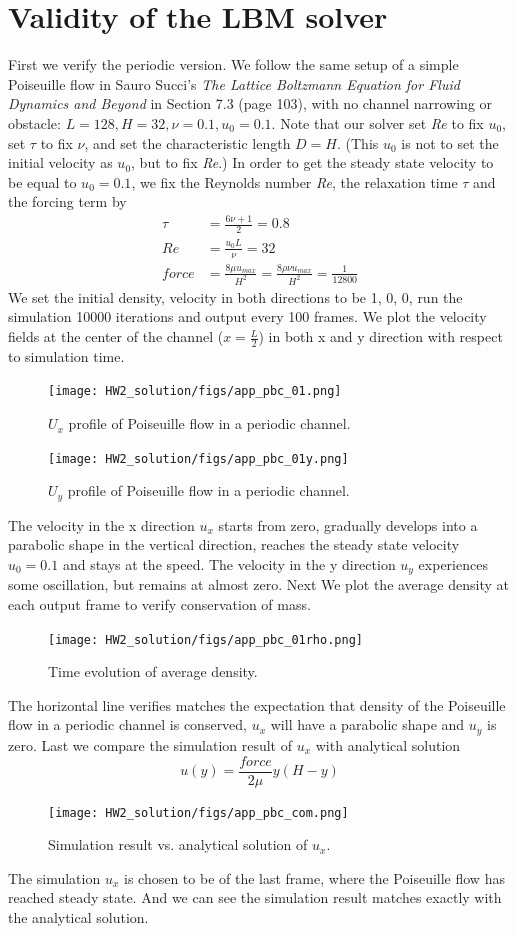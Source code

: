 \documentclass[11pt]{article}
\begin{document}
\appendix
\section{Validity of the LBM solver}
First we verify the periodic version. We follow the same setup of a simple Poiseuille flow in Sauro Succi's \textit{The Lattice Boltzmann Equation for Fluid Dynamics and Beyond} in Section 7.3 (page 103), with no channel narrowing or obstacle: $L=128, H=32, \nu=0.1, u_0=0.1$. Note that our solver set \textit{Re} to fix $u_0$, set $\tau$ to fix $\nu$, and set the characteristic length $D=H$. (This $u_0$ is not to set the initial velocity as $u_0$, but to fix \textit{Re}.) In order to get the steady state velocity to be equal to $u_0=0.1$, we fix the Reynolds number \textit{Re}, the relaxation time $\tau$ and the forcing term by
\begin{align}
    \tau &= \frac{6\nu +1}{2}=0.8 \\
    \textit{Re} &= \frac{u_0 L}{\nu}=32 \\
    force &= \frac{8\mu u_{max}}{H^2} = \frac{8\rho \nu u_{max}}{H^2} = \frac{1}{12800}
\end{align}
\noindent We set the initial density, velocity in both directions to be 1, 0, 0, run the simulation 10000 iterations and output every 100 frames. We plot the velocity fields at the center of the channel ($x=\frac{L}{2}$) in both x and y direction with respect to simulation time.
\begin{figure}[H]
    \centering
    \texttt{[image: HW2\_solution/figs/app\_pbc\_01.png]}
    \caption{$U_x$ profile of Poiseuille flow in a periodic channel.}
    \texttt{[image: HW2\_solution/figs/app\_pbc\_01y.png]}
    \caption{$U_y$ profile of Poiseuille flow in a periodic channel.}
\end{figure}
\noindent The velocity in the x direction $u_x$ starts from zero, gradually develops into a parabolic shape in the vertical direction, reaches the steady state velocity $u_0=0.1$ and stays at the speed. The velocity in the y direction $u_y$ experiences some oscillation, but remains at almost zero. Next We plot the average density at each output frame to verify conservation of mass.

\begin{figure}[H]
    \centering
    \texttt{[image: HW2\_solution/figs/app\_pbc\_01rho.png]}
    \caption{Time evolution of average density.}
\end{figure}
\noindent The horizontal line verifies matches the expectation that density of the Poiseuille flow in a periodic channel is conserved, $u_x$ will have a parabolic shape and $u_y$ is zero. Last we compare the simulation result of $u_x$ with analytical solution $$u(y)=\frac{force}{2\mu}y(H-y)$$
\begin{figure}[H]
    \centering
    \texttt{[image: HW2\_solution/figs/app\_pbc\_com.png]}
    \caption{Simulation result vs. analytical solution of $u_x$.}
\end{figure}
\noindent The simulation $u_x$ is chosen to be of the last frame, where the Poiseuille flow has reached steady state. And we can see the simulation result matches exactly with the analytical solution.
\end{document}
